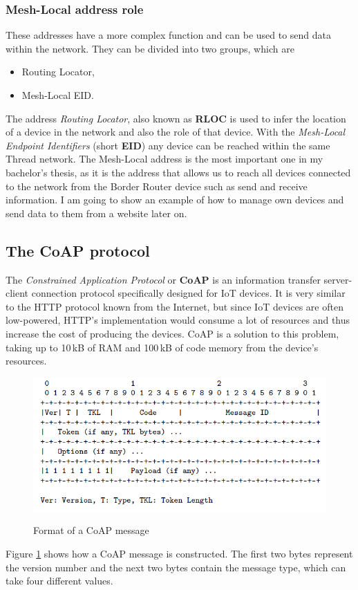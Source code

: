 \subsubsection{Mesh-Local address role}
These addresses have a more complex function and can be used to send data within the network. They can be divided into two groups, which are
\begin{itemize}
    \item Routing Locator,
    \item Mesh-Local EID.
\end{itemize}
The address \textit{Routing Locator}, also known as \textbf{RLOC} is used to infer the location of a device in the network and also the role of that device. With the \textit{Mesh-Local Endpoint Identifiers} (short \textbf{EID}) any device can be reached within the same Thread network. The Mesh-Local address is the most important one in my bachelor's thesis, as it is the address that allows us to reach all devices connected to the network from the Border Router device such as send and receive information. I am going to show an example of how to manage own devices and send data to them from a website later on.


\subsection{The CoAP protocol}
The \textit{Constrained Application Protocol} or \textbf{CoAP} is an information transfer server-client connection protocol specifically designed for IoT devices. It is very similar to the HTTP protocol known from the Internet, but since IoT devices are often low-powered, HTTP's implementation would consume a lot of resources and thus increase the cost of producing the devices. CoAP is a solution to this problem, taking up to 10\,\si{\kilo B} of RAM and 100\,\si{\kilo B} of code memory from the device's resources.\cite{coap_ram}
\begin{figure}
    \centering
    \includegraphics[width=\textwidth]{img/coapframe.png}
    \caption{Format of a CoAP message}
    \label{fig:coapmessage}
    \cite{coapcheat}
\end{figure}
Figure \ref{fig:coapmessage} shows how a CoAP message is constructed. The first two bytes represent the version number and the next two bytes contain the message type, which can take four different values.

